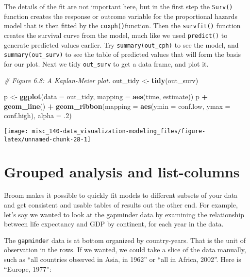 \documentclass[]{book}
\newenvironment{Shaded}{\begin{snugshade}}{\end{snugshade}}
\newcommand{\CommentTok}[1]{\textcolor[rgb]{0.56,0.35,0.01}{\textit{#1}}}
\newcommand{\DataTypeTok}[1]{\textcolor[rgb]{0.13,0.29,0.53}{#1}}
\newcommand{\FloatTok}[1]{\textcolor[rgb]{0.00,0.00,0.81}{#1}}
\newcommand{\KeywordTok}[1]{\textcolor[rgb]{0.13,0.29,0.53}{\textbf{#1}}}
\newcommand{\NormalTok}[1]{#1}
\newcommand{\OperatorTok}[1]{\textcolor[rgb]{0.81,0.36,0.00}{\textbf{#1}}}
\newcommand{\StringTok}[1]{\textcolor[rgb]{0.31,0.60,0.02}{#1}}
\begin{document}
The details of the fit are not important here, but in the first step the \texttt{Surv()} function creates the response or outcome variable for the proportional hazards model that is then fitted by the \texttt{coxph()}function. Then the \texttt{survfit()} function creates the survival curve from the model, much like we used \texttt{predict()} to generate predicted values earlier. Try \texttt{summary(out\_cph)} to see the model, and \texttt{summary(out\_surv)} to see the table of predicted values that will form the basis for our plot. Next we tidy \texttt{out\_surv} to get a data frame, and plot it.

\begin{Shaded}
\begin{Highlighting}[]
\CommentTok{# Figure 6.8: A Kaplan-Meier plot.}
\NormalTok{out_tidy <-}\StringTok{ }\KeywordTok{tidy}\NormalTok{(out_surv)}

\NormalTok{p <-}\StringTok{ }\KeywordTok{ggplot}\NormalTok{(}\DataTypeTok{data =}\NormalTok{ out_tidy, }\DataTypeTok{mapping =} \KeywordTok{aes}\NormalTok{(time, estimate))}
\NormalTok{p }\OperatorTok{+}\StringTok{ }\KeywordTok{geom_line}\NormalTok{() }\OperatorTok{+}
\StringTok{    }\KeywordTok{geom_ribbon}\NormalTok{(}\DataTypeTok{mapping =} \KeywordTok{aes}\NormalTok{(}\DataTypeTok{ymin =}\NormalTok{ conf.low, }\DataTypeTok{ymax =}\NormalTok{ conf.high), }\DataTypeTok{alpha =} \FloatTok{.2}\NormalTok{)}
\end{Highlighting}
\end{Shaded}

\begin{center}\texttt{[image: misc\_140-data\_visualization-modeling\_files/figure-latex/unnamed-chunk-28-1]} \end{center}

\hypertarget{grouped-analysis-and-list-columns}{%
\section{Grouped analysis and list-columns}\label{grouped-analysis-and-list-columns}}

Broom makes it possible to quickly fit models to different subsets of your data and get consistent and usable tables of results out the other end. For example, let's say we wanted to look at the gapminder data by examining the relationship between life expectancy and GDP by continent, for each year in the data.

The \texttt{gapminder} data is at bottom organized by country-years. That is the unit of observation in the rows. If we wanted, we could take a slice of the data manually, such as ``all countries observed in Asia, in 1962'' or ``all in Africa, 2002''. Here is ``Europe, 1977'':\\
\end{document}
